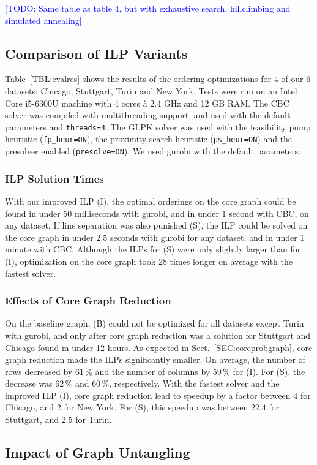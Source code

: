 \documentclass[sigconf]{acmart}
\newcommand\TODO[1]{\textcolor{blue}{\small [TODO: #1]}}
\begin{document}
\TODO{Same table as table 4, but with exhaustive search, hillclimbing and simulated annealing}

\subsection{Comparison of ILP Variants}

Table~\ref{TBL:evalres} shows the results of the ordering optimizations for 4 of our 6 datasets: Chicago, Stuttgart, Turin and New York. Tests were run on an Intel Core i5-6300U machine with 4 cores \`{a} 2.4 GHz and 12 GB RAM.
The CBC solver was compiled with multithreading support, and used with the default parameters and \texttt{threads=4}.
The GLPK solver was used with the feasibility pump heuristic (\texttt{fp\_heur=ON}), the proximity search heuristic (\texttt{ps\_heur=ON}) and the presolver enabled (\texttt{presolve=ON}). We used gurobi with the default parameters.
\subsubsection{ILP Solution Times} With our improved ILP (I), the optimal orderings on the core graph could be found in under 50 milliseconds with gurobi, and in under 1 second with CBC, on any dataset. If line separation was also punished (S), the ILP could be solved on the core graph in under 2.5 seconds with gurobi for any dataset, and in under 1 minute with CBC. Although the ILPs for (S) were only slightly larger than for (I), optimization on the core graph took $28$ times longer on average with the fastest solver.
\subsubsection{Effects of Core Graph Reduction} On the baseline graph, (B) could not be optimized for all datasets except Turin with gurobi, and only after core graph reduction was a solution for Stuttgart and Chicago found in under 12 hours. As expected in Sect.~\ref{SEC:coreprobgraph}, core graph reduction made the ILPs significantly smaller. On average, the number of rows decreased by $61\,\%$ and the number of columns by $59\,\%$ for (I). For (S), the decrease was $62\,\%$ and $60\,\%$, respectively. With the fastest solver and the improved ILP (I), core graph reduction lead to speedup by a factor between $4$ for Chicago, and 2 for New York. For (S), this speedup was between $22.4$ for Stuttgart, and $2.5$ for Turin.

\subsection{Impact of Graph Untangling}
\end{document}
